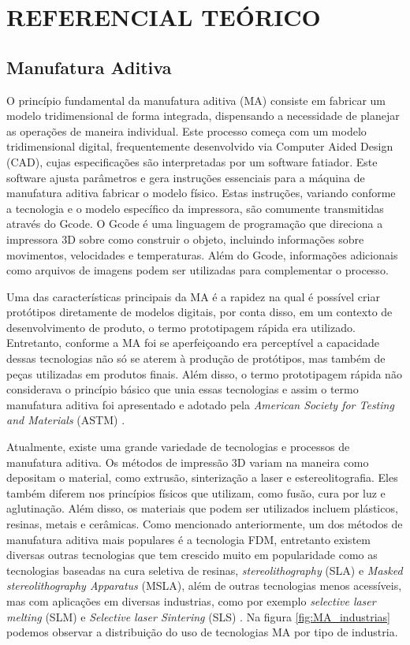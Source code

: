 \chapter{REFERENCIAL TEÓRICO}

\section{Manufatura Aditiva}
O princípio fundamental da manufatura aditiva (MA) consiste em fabricar um modelo tridimensional de forma integrada, dispensando a necessidade de planejar as operações de maneira individual. Este processo começa com um modelo tridimensional digital, frequentemente desenvolvido via Computer Aided Design (CAD), cujas especificações são interpretadas por um software fatiador. Este software ajusta parâmetros e gera instruções essenciais para a máquina de manufatura aditiva fabricar o modelo físico. Estas instruções, variando conforme a tecnologia e o modelo específico da impressora, são comumente transmitidas através do Gcode. O Gcode é uma linguagem de programação que direciona a impressora 3D sobre como construir o objeto, incluindo informações sobre movimentos, velocidades e temperaturas. Além do Gcode, informações adicionais como arquivos de imagens podem ser utilizadas para complementar o processo.

Uma das características principais da MA é a rapidez na qual é possível criar protótipos diretamente de modelos digitais, por conta disso, em um contexto de desenvolvimento de produto, o termo prototipagem rápida era utilizado. Entretanto, conforme a MA foi se aperfeiçoando era perceptível a capacidade dessas tecnologias não só se aterem à produção de protótipos, mas também de peças utilizadas em produtos finais. Além disso, o termo prototipagem rápida não considerava o princípio básico que unia essas tecnologias e assim o termo manufatura aditiva foi apresentado e adotado pela \textit{American Society for Testing and Materials} (ASTM) \cite{gibson15}.

Atualmente, existe uma grande variedade de tecnologias e processos de manufatura aditiva. Os métodos de impressão 3D variam na maneira como depositam o material, como extrusão, sinterização a  laser e estereolitografia. Eles também diferem nos princípios físicos que utilizam, como fusão, cura por luz e aglutinação. Além disso, os materiais que podem ser utilizados incluem plásticos, resinas, metais e cerâmicas. Como mencionado anteriormente, um dos métodos de manufatura aditiva mais populares é a tecnologia FDM, entretanto existem diversas outras tecnologias que tem crescido muito em popularidade como as tecnologias baseadas na cura seletiva de resinas, \textit{stereolithography} (SLA) e \textit{Masked stereolithography Apparatus} (MSLA), além de outras tecnologias menos acessíveis, mas com aplicações em diversas industrias, como por exemplo \textit{selective laser melting} (SLM) e \textit{Selective laser Sintering} (SLS) \cite{bikas16}. Na figura \ref{fig:MA_industrias} podemos observar a distribuição do uso de tecnologias MA por tipo de industria.   

